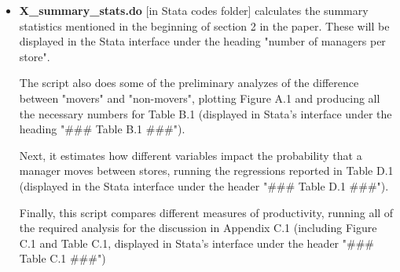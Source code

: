 \documentclass[
]{article}
\begin{document}
\begin{itemize}
    Using the estimates from the event studies, this script also produces the results required to construct {\color{blue}Table 4}, which are displayed in Stata's interface when the code is run. The replicator can find this information next to the headers "\#\#\# Table 4 (Panel A) \#\#\#" and "\#\#\# Table 4 (Panel B) \#\#\#". These will indicate results before and after the change in manager by the indicator "post\_change" (=0 for before change; =1 for after change). The point estimates named "b\_tb" for a top-to-bottom change and "b\_bt" for a bottom-to-top change. 

    In addition, the script analyzes what changes for managers and stores when a store switches managers, producing {\color{blue}Figure 7} and {\color{blue}Figure A.5}. The tenure gap mentioned in {\color{blue}Section 4.1} are also calculated here, and will be displayed in the Stata interface under the heaer "Average tenure change (section 4.1)".
    
    Finally, after breaking managers and stores into terciles based on their qualities and once again looking at the initial matches and moves, the script produces {\color{blue}Figure D.1}, as well as {\color{blue}Table 2} and {\color{blue}Table 3}. Data for both tables are saved in the "Results/Tables" folder (under "Table\_2\_X.dta" and "Table\_3\_X.dta").

    \item \textbf{X\_summary\_stats.do} [in Stata codes folder] calculates the summary statistics mentioned in the beginning of {\color{blue}section 2} in the paper. These will be displayed in the Stata interface under the heading "number of managers per store".
    
    The script also does some of the preliminary analyzes of the difference between "movers" and "non-movers", plotting {\color{blue}Figure A.1} and producing all the necessary numbers for {\color{blue}Table B.1} (displayed in Stata's interface under the heading "\#\#\# Table B.1 \#\#\#"). 
    
    Next, it estimates how different variables impact the probability that a manager moves between stores, running the regressions reported in {\color{blue}Table D.1} (displayed in the Stata interface under the header "\#\#\# Table D.1 \#\#\#"). 
    
    Finally, this script compares different measures of productivity, running all of the required analysis for the discussion in {\color{blue}Appendix C.1} (including {\color{blue}Figure C.1} and {\color{blue}Table C.1}, displayed in Stata's interface under the header "\#\#\# Table C.1 \#\#\#")


\end{itemize}
\end{document}
